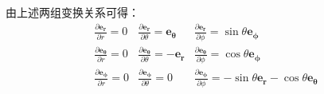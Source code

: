 \documentclass[UTF8]{ctexart}
\newcommand{\tmmathbf}[1]{\ensuremath{\boldsymbol{#1}}}
\begin{document}
由上述两组变换关系可得：
\begin{equation} \label{eq55}
  \begin{array}{ccc}
    \frac{\partial \tmmathbf{e_r}}{\partial r} = 0 & \frac{\partial
    \tmmathbf{e_r}}{\partial \theta} = \tmmathbf{e_{\theta}} & \frac{\partial
    \tmmathbf{e_r}}{\partial \phi} = \sin \theta \tmmathbf{e_{\phi}}\\
    \frac{\partial \tmmathbf{e_{\theta}}}{\partial r} = 0 & \frac{\partial
    \tmmathbf{e_{\theta}}}{\partial \theta} = - \tmmathbf{e_r} &
    \frac{\partial \tmmathbf{e_{\theta}}}{\partial \phi} = \cos \theta
    \tmmathbf{e_{\phi}}\\
    \frac{\partial \tmmathbf{e_{\phi}}}{\partial r} = 0 & \frac{\partial
    \tmmathbf{e_{\phi}}}{\partial \theta} = 0 & \frac{\partial
    \tmmathbf{e_{\phi}}}{\partial \phi} = - \sin \theta \tmmathbf{e_r} - \cos
    \theta \tmmathbf{e_{\theta}}
  \end{array}
\end{equation}
\end{document}
